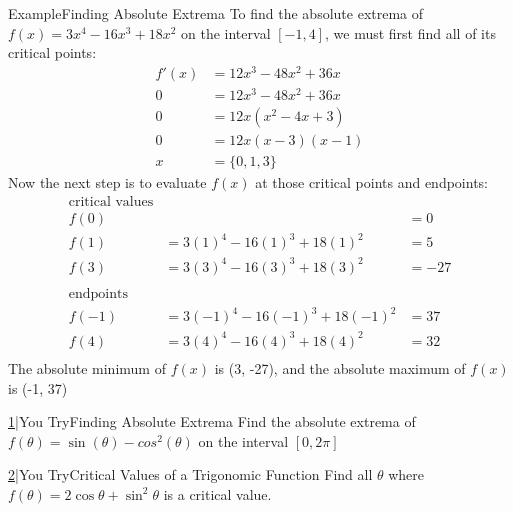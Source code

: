 \documentclass{MathNotes}
\newenvironment{example}[1]{\begin{BlueBox}{Example}{#1}}{\end{BlueBox}}
\newenvironment{practice}[2]{\begin{PurpleBox}{\texorpdfstring{#1}\Big|You Try}{#2}}{\end{PurpleBox}}
\begin{document}
\begin{example}{Finding Absolute Extrema}
    To find the absolute extrema of $f(x)=3x^4-16x^3+18x^2$ on the interval
    $[-1, 4]$, we must first find all of its critical points:
    \begin{align*}
        f'(x)&=12x^3-48x^2+36x\\
        0&=12x^3-48x^2+36x\\
        0&=12x(x^2-4x+3)\\
        0&=12x(x-3)(x-1)\\
        x&=\{0, 1, 3\}
    \end{align*}
    Now the next step is to evaluate $f(x)$ at those critical points and
    endpoints:
    \begin{align*}
        \text{critical values}\\
        f(0)&&=0\\
        f(1)&=3(1)^4-16(1)^3+18(1)^2&=5\\
        f(3)&=3(3)^4-16(3)^3+18(3)^2&=-27\\
        \\
        \text{endpoints}\\
        f(-1)&=3(-1)^4-16(-1)^3+18(-1)^2&=37\\
        f(4)&=3(4)^4-16(4)^3+18(4)^2&=32\\
    \end{align*}
    The absolute minimum of $f(x)$ is (3, -27), and the absolute maximum of
    $f(x)$ is (-1, 37)
\end{example}

\begin{multicols}{2}
\begin{practice}{\hyperref[ans:3.1-1]{1}}{Finding Absolute Extrema}
    \label{prac:3.1-1}
    Find the absolute extrema of $f(\theta)=\sin(\theta)-cos^2(\theta)$ on
    the interval $[0, 2\pi]$
\end{practice}
\begin{practice}{\hyperref[ans:3.1-2]{2}}{Critical Values of a Trigonomic Function}
    \label{prac:3.1-2}
    Find all $\theta$ where $\displaystyle f(\theta)=2\cos\theta+\sin^2\theta$
    is a critical value.
\end{practice}
\end{multicols}

\newpage
\end{document}
